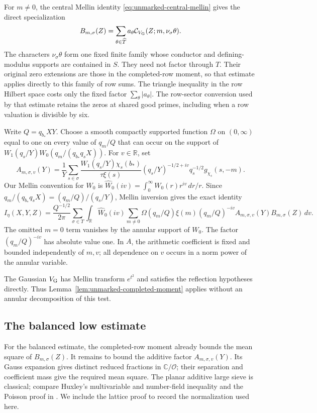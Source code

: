 \documentclass[11pt,a4paper]{article}
\numberwithin{equation}{section}
\numberwithin{figure}{section}
\theoremstyle{definition}
\theoremstyle{remark}
\begin{document}
For $m\ne0$, the central Mellin identity
\eqref{eq:unmarked-central-mellin} gives the direct specialization
\[
 B_{m,\sigma}(Z)=\sum_{\theta\in\widehat T}a_\theta
       \mathcal C_{V_{\rm G}}(Z;m,\nu_\sigma\theta).
\]
The characters $\nu_\sigma\theta$ form one fixed finite family whose
conductor and defining-modulus supports are contained in $S$. They need
not factor through $T$. Their original zero extensions are those in the
completed-row moment, so that estimate applies directly to this family
of row sums. The triangle inequality in the row Hilbert space costs only
the fixed factor $\sum_\theta|a_\theta|$. The row-sector conversion used
by that estimate retains the zeros at shared good primes, including when
a row valuation is divisible by six.

Write $Q=q_{b_*}XY$.  Choose a smooth compactly supported function
$\Omega$ on $(0,\infty)$ equal to one on every value of $q_m/Q$
that can occur on the support of
$W_1(q_s/Y)W_0(q_m/(q_{b_*}q_sX))$.  For $v\in\mathbb R$, set
\[
 A_{m,\sigma,v}(Y)=\frac1Y\sum_{s\in\sigma}
 \frac{W_1(q_s/Y)\chi_s(b_*)}{\tau\xi(s)}
 (q_s/Y)^{-1/2+iv}q_s^{-1/2}g_{\chi_s}(s,-m).
\]
Our Mellin convention for $W_0$ is
$\widehat W_0(iv)=\int_0^\infty W_0(r)r^{iv}\,dr/r$.
Since
$q_m/(q_{b_*}q_sX)=(q_m/Q)/(q_s/Y)$, Mellin inversion gives the
exact identity
\begin{equation}\label{eq:low-separated}
 I_\eta(X,Y,Z)=\frac{Q^{-1/2}}{2\pi}
 \sum_{\sigma\in T}\int_{\mathbb R}\widehat W_0(iv)
 \sum_{m\ne0}\Omega(q_m/Q)\xi(m)(q_m/Q)^{-iv}
                 A_{m,\sigma,v}(Y)B_{m,\sigma}(Z)\,dv.
\end{equation}
The omitted $m=0$ term vanishes by the annular support of $W_0$.
The factor $(q_m/Q)^{-iv}$ has absolute value one.  In $A$, the
arithmetic coefficient is fixed and bounded independently of $m,v$;
all dependence on $v$ occurs in a norm power of the annular variable.

The Gaussian $V_{\rm G}$ has Mellin transform $e^{t^2}$ and satisfies
the reflection hypotheses directly. Thus
Lemma~\ref{lem:unmarked-completed-moment} applies without an annular
decomposition of this test.

\subsection{The balanced low estimate}

For the balanced estimate, the completed-row moment already bounds the
mean square of $B_{m,\sigma}(Z)$. It remains to bound the additive factor
$A_{m,\sigma,v}(Y)$. Its Gauss expansion gives distinct reduced fractions
in $\mathbb C/\mathcal O$; their separation and coefficient mass give the
required mean square. The planar additive large sieve is classical;
compare Huxley's multivariable and number-field inequality \cite{Huxley}
and the Poisson proof in \cite[Section~3, Theorem~3]{BaierBansal}. We
include the lattice proof to record the normalization used here.
\end{document}

